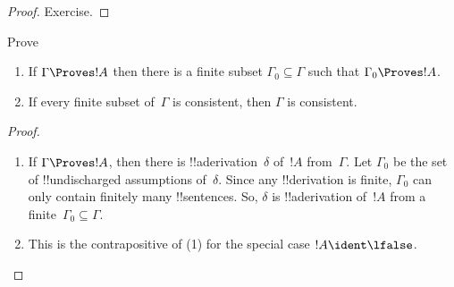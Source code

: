 \documentclass[../../../include/open-logic-section]{subfiles}
\begin{document}
\begin{proof}
Exercise.
\end{proof}

\begin{prob}
Prove 
\end{prob}

\begin{prop}[Compactness]
  \begin{enumerate}
  \item If $\Gamma \Proves !A$ then there is a finite subset $\Gamma_0
    \subseteq \Gamma$ such that $\Gamma_0 \Proves !A$.
  \item If every finite subset of~$\Gamma$ is
    consistent, then $\Gamma$ is consistent.
  \end{enumerate}
\end{prop}

\begin{proof}
  \begin{enumerate}
    \item If $\Gamma \Proves !A$, then there is
      !!a{derivation}~$\delta$ of~$!A$ from~$\Gamma$. Let $\Gamma_0$
      be the set of !!{undischarged} assumptions of~$\delta$.  Since
      any !!{derivation} is finite, $\Gamma_0$ can only contain
      finitely many !!{sentence}s.  So, $\delta$ is !!a{derivation}
      of~$!A$ from a finite~$\Gamma_0 \subseteq \Gamma$.
    \item This is the contrapositive of (1) for the special case $!A
      \ident \lfalse$.
  \end{enumerate}
\end{proof}
\end{document}
